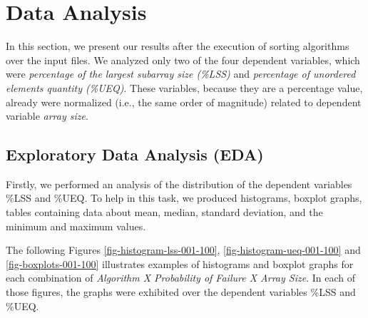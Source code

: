\section{Data Analysis}

In this section, we present our results after the execution of sorting algorithms over the input files. We analyzed only two of the four dependent variables, which were \textit{percentage of the largest subarray size (\%LSS)} and \textit{percentage of unordered elements quantity (\%UEQ)}. These variables, because they are a percentage value, already were normalized (i.e., the same order of magnitude) related to dependent variable \textit{array size}.

\subsection{Exploratory Data Analysis (EDA)}

Firstly, we performed an analysis of the distribution of the dependent variables \%LSS and \%UEQ. To help in this task, we produced histograms, boxplot graphs, tables containing data about mean, median, standard deviation, and the minimum and maximum values.

The following Figures \ref{fig-histogram-lss-001-100}, \ref{fig-histogram-ueq-001-100} and \ref{fig-boxplots-001-100} illustrates examples of histograms and boxplot graphs for each combination of \textit{Algorithm X Probability of Failure X Array Size}. In each of those figures, the graphs were exhibited over the dependent variables \%LSS and \%UEQ.

